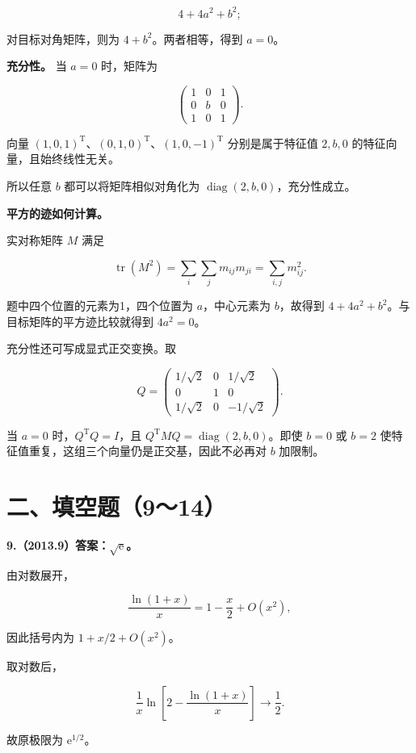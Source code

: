 \documentclass[UTF8,11pt,fontset=windows]{ctexart}
\begin{document}
$$
4+4a^2+b^2;
$$

对目标对角矩阵，则为 $4+b^2$。两者相等，得到 $a=0$。

\textbf{充分性。} 当 $a=0$ 时，矩阵为

$$
\begin{pmatrix}1&0&1\\0&b&0\\1&0&1\end{pmatrix}.
$$

向量 $(1,0,1)^{\mathrm T}$、$(0,1,0)^{\mathrm T}$、$(1,0,-1)^{\mathrm T}$ 分别是属于特征值 $2,b,0$ 的特征向量，且始终线性无关。

所以任意 $b$ 都可以将矩阵相似对角化为 $\operatorname{diag}(2,b,0)$，充分性成立。

\textbf{平方的迹如何计算。}

实对称矩阵 $M$ 满足

$$
\operatorname{tr}(M^2)=\sum_i\sum_jm_{ij}m_{ji}=\sum_{i,j}m_{ij}^2.
$$

题中四个位置的元素为1，四个位置为 $a$，中心元素为 $b$，故得到 $4+4a^2+b^2$。与目标矩阵的平方迹比较就得到 $4a^2=0$。

充分性还可写成显式正交变换。取

$$
Q=\begin{pmatrix}
1/\sqrt2&0&1/\sqrt2\\
0&1&0\\
1/\sqrt2&0&-1/\sqrt2
\end{pmatrix}.
$$

当 $a=0$ 时，$Q^{\mathrm T}Q=I$，且 $Q^{\mathrm T}MQ=\operatorname{diag}(2,b,0)$。即使 $b=0$ 或 $b=2$ 使特征值重复，这组三个向量仍是正交基，因此不必再对 $b$ 加限制。

\clearpage

\section*{二、填空题（9～14）}

\textbf{9.（2013.9）答案：$\sqrt{\mathrm e}$。}

由对数展开，

$$
\frac{\ln(1+x)}x=1-\frac x2+O(x^2),
$$

因此括号内为 $1+x/2+O(x^2)$。

取对数后，

$$
\frac1x\ln\left[2-\frac{\ln(1+x)}x\right]\longrightarrow\frac12.
$$

故原极限为 $\mathrm e^{1/2}$。
\end{document}
